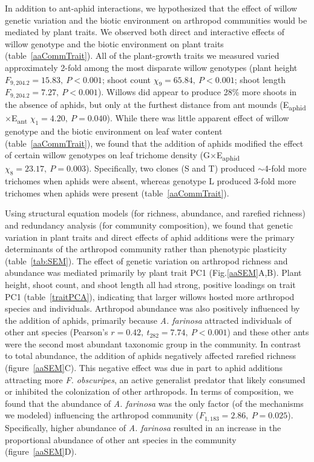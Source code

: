\documentclass[11pt]{article}
\begin{document}
In addition to ant-aphid interactions, we hypothesized that the effect
of willow genetic variation and the biotic environment on arthropod
communities would be mediated by plant traits. We observed both direct
and interactive effects of willow genotype and the biotic environment on
plant traits (table~\ref{aaCommTrait}). All of the plant-growth traits we measured
varied approximately 2-fold among the most disparate willow genotypes
(plant height \(F_{9,204.2}=15.83,\ P<0.001\); shoot count \(\chi_9=65.84,\ P<0.001\); shoot
length \(F_{9,204.2}=7.27,\ P<0.001\)). Willows did appear to produce 28\% more
shoots in the absence of aphids, but only at the furthest distance from
ant mounds (E\textsubscript{aphid}$\times$E\textsubscript{ant} $\chi_1=4.20,\ P=0.040$). While there was little apparent effect
of willow genotype and the biotic environment on leaf water content
(table~\ref{aaCommTrait}), we found that the addition of aphids modified the effect of
certain willow genotypes on leaf trichome density (G$\times$E\textsubscript{aphid} $\chi_8=23.17,\ P=0.003$).
Specifically, two clones (S and T) produced $\sim$4-fold more
trichomes when aphids were absent, whereas genotype L produced 3-fold
more trichomes when aphids were present (table~\ref{aaCommTrait}).

Using structural equation models (for richness, abundance, and rarefied
richness) and redundancy analysis (for community composition), we found
that genetic variation in plant traits and direct effects of aphid additions
were the primary determinants of the arthropod community rather than
phenotypic plasticity (table~\ref{tab:SEM}). The effect of genetic variation
on arthropod richness and abundance was mediated primarily by plant
trait PC1 (Fig.\ref{aaSEM}A,B). Plant height, shoot count, and shoot length all
had strong, positive loadings on trait PC1 (table~\ref{traitPCA}), indicating that
larger willows hosted more arthropod species and individuals. Arthropod
abundance was also positively influenced by the addition of aphids,
primarily because \textit{A. farinosa} attracted individuals of other ant species
(Pearson's \(r=0.42,\ t_{282}=7.74,\ P<0.001\)) and these other ants were the second most
abundant taxonomic group in the community. In contrast to total
abundance, the addition of aphids negatively affected rarefied richness
(figure~\ref{aaSEM}C). This negative effect was due in part to aphid additions
attracting more \textit{F. obscuripes}, an active generalist predator that
likely consumed or inhibited the colonization of other arthropods. In
terms of composition, we found that the abundance of \textit{A. farinosa}
was the only factor (of the mechanisms we modeled) influencing the
arthropod community (\(F_{1,183}=2.86,\ P=0.025\)). Specifically, higher abundance
of \textit{A. farinosa} resulted in an increase in the proportional
abundance of other ant species in the community (figure~\ref{aaSEM}D).
\end{document}
